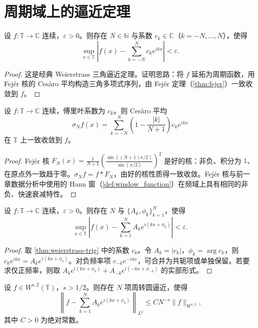 \section{周期域上的逼近定理}

\begin{theorem}\label{thm:weierstrass-trig}
设 $f:\mathbb T\to\mathbb C$ 连续，$\varepsilon>0$。则存在 $N\in\mathbb N$ 与系数 $c_k\in\mathbb C$（$k=-N,\dots,N$），使得
\[
\sup_{x\in\mathbb T}\left|f(x)-\sum_{k=-N}^{N}c_k e^{ikx}\right|<\varepsilon.
\]
\end{theorem}

\begin{proof}
这是经典 Weierstrass 三角逼近定理。证明思路：将 $f$ 延拓为周期函数，用 Fejér 核的 Cesàro 平均构造三角多项式序列，由 Fejér 定理（\cref{thm:fejer}）一致收敛到 $f$。
\end{proof}

\begin{theorem}[Fejér 定理]\label{thm:fejer}
设 $f:\mathbb T\to\mathbb C$ 连续，傅里叶系数为 $c_k$。则 Cesàro 平均
\[
\sigma_N f(x)=\sum_{k=-N}^{N}\left(1-\frac{|k|}{N+1}\right)c_k e^{ikx}
\]
在 $\mathbb T$ 上一致收敛到 $f$。
\end{theorem}

\begin{proof}
Fejér 核 $F_N(x)=\frac{1}{N+1}\left(\frac{\sin((N+1)x/2)}{\sin(x/2)}\right)^2$ 是好的核：非负、积分为 $1$、在原点外一致趋于零。$\sigma_N f=f*F_N$，由好的核性质得一致收敛。Fejér 核与前一章数据分析中使用的 Hann 窗（\cref{def:window_function}）在频域上具有相同的非负、快速衰减特性。
\end{proof}

\begin{corollary}[周转圆激活的周期逼近]\label{cor:epicycle-periodic-approx}
设 $f:\mathbb T\to\mathbb C$ 连续，$\varepsilon>0$。则存在 $N$ 与 $\{A_k,\phi_k\}_{k=1}^{N}$，使得
\[
\sup_{x\in\mathbb T}\left|f(x)-\sum_{k=1}^{N}A_k e^{i(kx+\phi_k)}\right|<\varepsilon.
\]
\end{corollary}

\begin{proof}
取 \cref{thm:weierstrass-trig} 中的系数 $c_k$。令 $A_k=|c_k|$，$\phi_k=\arg c_k$，则 $c_k e^{ikx}=A_k e^{i(kx+\phi_k)}$。对负频率项 $c_{-k}e^{-ikx}$，可合并为共轭项或单独保留。若要求仅正频率，则取 $A_k e^{i(kx+\phi_k)}+A_{-k}e^{i(-kx+\phi_{-k})}$ 的实部形式。
\end{proof}

\begin{theorem}\label{thm:sobolev-rate}
设 $f\in W^{s,2}(\mathbb T)$，$s>1/2$。则存在 $N$ 项周转圆逼近，使得
\[
\left\|f-\sum_{k=1}^{N}A_k e^{i(kx+\phi_k)}\right\|_{L^2}\le C N^{-s}\|f\|_{W^{s,2}},
\]
其中 $C>0$ 为绝对常数。
\end{theorem}

